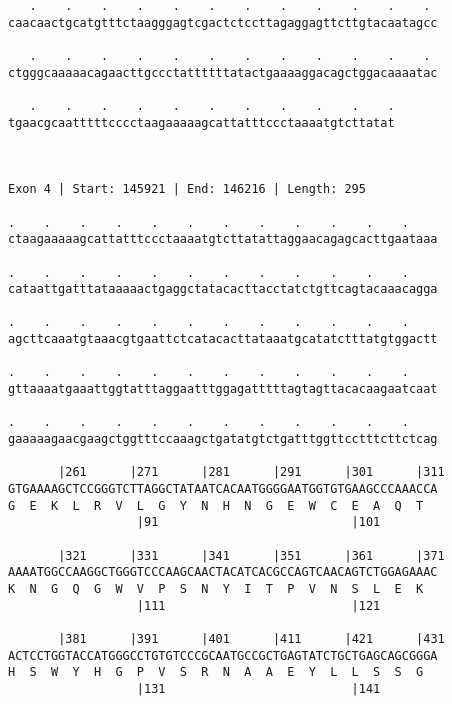 \documentclass{article}
\begin{document}
\begin{Verbatim}
   .    .    .    .    .    .    .    .    .    .    .    . 
caacaactgcatgtttctaagggagtcgactctccttagaggagttcttgtacaatagcc
                                                            
   .    .    .    .    .    .    .    .    .    .    .    . 
ctgggcaaaaacagaacttgccctattttttatactgaaaaggacagctggacaaaatac
                                                            
   .    .    .    .    .    .    .    .    .    .    .
tgaacgcaatttttcccctaagaaaaagcattatttccctaaaatgtcttatat
                                                      
                                                      
 
Exon 4 | Start: 145921 | End: 146216 | Length: 295
 
.    .    .    .    .    .    .    .    .    .    .    .    
ctaagaaaaagcattatttccctaaaatgtcttatattaggaacagagcacttgaataaa
                                                            
.    .    .    .    .    .    .    .    .    .    .    .    
cataattgatttataaaaactgaggctatacacttacctatctgttcagtacaaacagga
                                                            
.    .    .    .    .    .    .    .    .    .    .    .    
agcttcaaatgtaaacgtgaattctcatacacttataaatgcatatctttatgtggactt
                                                            
.    .    .    .    .    .    .    .    .    .    .    .    
gttaaaatgaaattggtatttaggaatttggagatttttagtagttacacaagaatcaat
                                                            
.    .    .    .    .    .    .    .    .    .    .    .    
gaaaaagaacgaagctggtttccaaagctgatatgtctgatttggttcctttcttctcag
                                                            
       |261      |271      |281      |291      |301      |311
GTGAAAAGCTCCGGGTCTTAGGCTATAATCACAATGGGGAATGGTGTGAAGCCCAAACCA
G  E  K  L  R  V  L  G  Y  N  H  N  G  E  W  C  E  A  Q  T  
                  |91                           |101        
  
       |321      |331      |341      |351      |361      |371
AAAATGGCCAAGGCTGGGTCCCAAGCAACTACATCACGCCAGTCAACAGTCTGGAGAAAC
K  N  G  Q  G  W  V  P  S  N  Y  I  T  P  V  N  S  L  E  K  
                  |111                          |121        
  
       |381      |391      |401      |411      |421      |431
ACTCCTGGTACCATGGGCCTGTGTCCCGCAATGCCGCTGAGTATCTGCTGAGCAGCGGGA
H  S  W  Y  H  G  P  V  S  R  N  A  A  E  Y  L  L  S  S  G  
                  |131                          |141        
  

\end{Verbatim}
\end{document}
